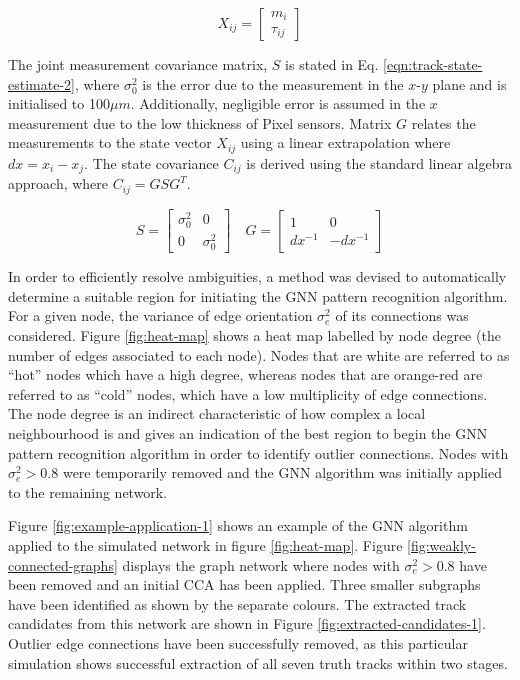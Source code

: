 \begin{equation}
X_{ij} = \begin{bmatrix} m_i \\ \tau_{ij} \end{bmatrix}
\label{eqn:track-state-estimate}
\end{equation}

The joint measurement covariance matrix, $S$ is stated in Eq. \eqref{eqn:track-state-estimate-2}, where $\sigma_0^{2}$ is the error due to the measurement in the $x$-$y$ plane and is initialised to 100$\mu m$. Additionally, negligible error is assumed in the $x$ measurement due to the low thickness of Pixel sensors. Matrix $G$ relates the measurements to the state vector $X_{ij}$ using a linear extrapolation where $dx = x_i - x_j$. The state covariance $C_{ij}$ is derived using the standard linear algebra approach, where $C_{ij} = GSG^T$. 

\begin{equation}
S = \begin{bmatrix} \sigma_0^{2} & 0 \\ 0 & \sigma_0^{2} \end{bmatrix}  \quad G = \begin{bmatrix} 1 & 0 \\ dx^{-1} & -dx^{-1}  \end{bmatrix}
\label{eqn:track-state-estimate-2}
\end{equation}


In order to efficiently resolve ambiguities, a method was devised to automatically determine a suitable region for initiating the GNN pattern recognition algorithm. For a given node, the variance of edge orientation $\sigma_e^2$ of its connections was considered. Figure \ref{fig:heat-map} shows a heat map labelled by node degree (the number of edges associated to each node). Nodes that are white are referred to as ``hot'' nodes which have a high degree, whereas nodes that are orange-red are referred to as ``cold'' nodes, which have a low multiplicity of edge connections. The node degree is an indirect characteristic of how complex a local neighbourhood is and gives an indication of the best region to begin the GNN pattern recognition algorithm in order to identify outlier connections. Nodes with $\sigma_e^2 > 0.8$ were temporarily removed and the GNN algorithm was initially applied to the remaining network.

Figure \ref{fig:example-application-1} shows an example of the GNN algorithm applied to the simulated network in figure \ref{fig:heat-map}. Figure \ref{fig:weakly-connected-graphs} displays the graph network where nodes with $\sigma_e^2 > 0.8$ have been removed and an initial CCA has been applied. Three smaller subgraphs have been identified as shown by the separate colours. The extracted track candidates from this network are shown in Figure \ref{fig:extracted-candidates-1}. Outlier edge connections have been successfully removed, as this particular simulation shows successful extraction of all seven truth tracks within two stages.

